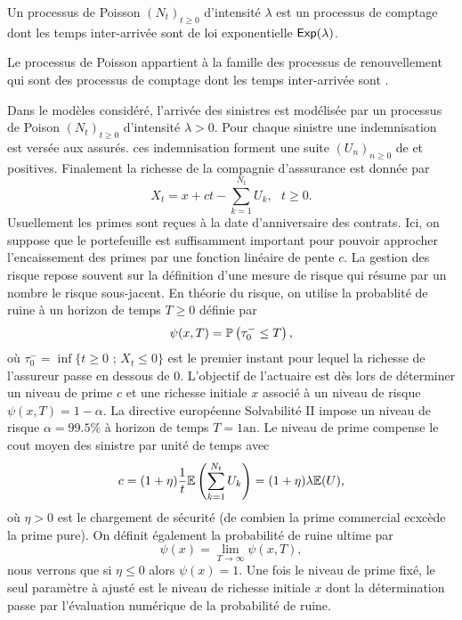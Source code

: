 \begin{definition}\label{def_poisson_process}
Un processus de Poisson $(N_t)_{t\geq0}$ d'intensité $\lambda$ est un processus de comptage dont les temps inter-arrivée \iid sont de loi exponentielle $\mathsf{Exp}(\lambda)$.
\end{definition}
\begin{remark}\label{def_renewal_process}
Le processus de Poisson appartient à la famille des processus de renouvellement qui sont des processus de comptage dont les temps inter-arrivée sont \iid.
\end{remark}
Dans le modèles considéré, l'arrivée des sinistres est modélisée par un processus de Poison $(N_t)_{t\geq0}$ d'intensité $\lambda>0$. Pour chaque sinistre une indemnisation est versée aux assurés. ces indemnisation forment une suite $(U_n)_{n\geq0}$ de \va \iid et positives. Finalement la richesse de la compagnie d'asssurance est donnée par 
\begin{equation}\label{eq:cramer_lundberg_modele}
X_t = x + ct - \sum_{k=1}^{N_t}U_k,\text{ }t\geq 0.
\end{equation}
Usuellement les primes sont reçues à la date d'anniversaire des contrats. Ici, on suppose que le portefeuille est suffisamment important pour pouvoir approcher l'encaissement des primes par une fonction linéaire de pente $c$. La gestion des risque repose souvent sur la définition d'une mesure de risque qui résume par un nombre le risque sous-jacent. En théorie du risque, on utilise la probablité de ruine à un horizon de temps $T\geq 0$ définie par 
$$
\psi(x,T) = \mathbb{P}\left(\tau_0^-\leq T\right),
$$
où $\tau_0^- = \inf\{t\geq 0\text{ ; }X_t\leq0\}$ est le premier instant pour lequel la richesse de l'assureur passe en dessous de $0$. L'objectif de l'actuaire est dès lors de déterminer un niveau de prime $c$ et une richesse initiale $x$ associé à un niveau de risque $\psi(x,T) = 1-\alpha$. La directive européenne Solvabilité II impose un niveau de risque $\alpha = 99.5\%$ à horizon de temps $T= 1 \text{an}$. Le niveau de prime compense le cout moyen des sinistre par unité de temps avec 
$$
c = (1+\eta)\frac{1}{t}\mathbb{E}\left(\sum_{k=1}^{N_t}U_k\right) = (1+\eta)\lambda\mathbb{E}(U),
$$
où $\eta>0$ est le chargement de sécurité (de combien la prime commercial ecxcède la prime pure). On définit également la probabilité de ruine ultime par 
$$
\psi(x) = \underset{T\rightarrow \infty}{\lim} \psi(x,T),
$$
nous verrons que si $\eta \leq 0$ alors $\psi(x) = 1$. Une fois le niveau de prime fixé, le seul paramètre à ajusté est le niveau de richesse initiale $x$ dont la détermination passe par l'évaluation numérique de la probabilité de ruine.
